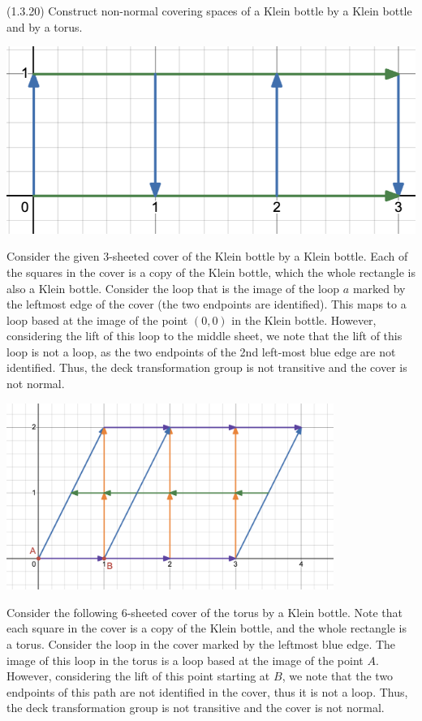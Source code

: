 \documentclass[12pt]{article}
\begin{document}
\begin{problem}{2}
    (1.3.20) Construct non-normal covering spaces of a Klein bottle by a Klein bottle and by a torus. 
\end{problem}

\begin{solution}
    \bbni
    \begin{center}
        \includegraphics{hwk6_kleincover.png}
    \end{center}
    Consider the given $3$-sheeted cover of the Klein bottle by a Klein bottle. Each of the squares in the cover is a copy of the Klein bottle, which the whole rectangle is also a Klein bottle. Consider the loop that is the image of the loop $a$ marked by the leftmost edge of the cover (the two endpoints are identified). This maps to a loop based at the image of the point $(0, 0)$ in the Klein bottle. However, considering the lift of this loop to the middle sheet, we note that the lift of this loop is not a loop, as the two endpoints of the 2nd left-most blue edge are not identified. Thus, the deck transformation group is not transitive and the cover is not normal. \bbni
    \begin{center}
        \includegraphics[width=0.8\textwidth]{hwk6_toruscover.png}
    \end{center}
    Consider the following $6$-sheeted cover of the torus by a Klein bottle. Note that each square in the cover is a copy of the Klein bottle, and the whole rectangle is a torus. Consider the loop in the cover marked by the leftmost blue edge. The image of this loop in the torus is a loop based at the image of the point $A$. However, considering the lift of this point starting at $B$, we note that the two endpoints of this path are not identified in the cover, thus it is not a loop. Thus, the deck transformation group is not transitive and the cover is not normal.
\end{solution}
\newpage
\end{document}

